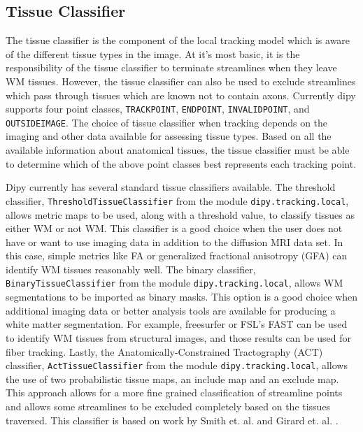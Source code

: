 \subsection{Tissue Classifier}
    The tissue classifier is the component of the local tracking model which is aware of the different tissue types in the image. At it's most basic, it is the responsibility of the tissue classifier to terminate streamlines when they leave WM tissues. However, the tissue classifier can also be used to exclude streamlines which pass through tissues which are known not to contain axons. Currently dipy supports four point classes, \verb|TRACKPOINT|, \verb|ENDPOINT|, \verb|INVALIDPOINT|, and \verb|OUTSIDEIMAGE|. The choice of tissue classifier when tracking depends on the imaging and other data available for assessing tissue types. Based on all the available information about anatomical tissues, the tissue classifier must be able to determine which of the above point classes best represents each tracking point.
    
    Dipy currently has several standard tissue classifiers available. The threshold classifier, \verb|ThresholdTissueClassifier| from the module \verb|dipy.tracking.local|, allows metric maps to be used, along with a threshold value, to classify tissues as either WM or not WM. This classifier is a good choice when the user does not have or want to use imaging data in addition to the diffusion MRI data set. In this case, simple metrics like FA or generalized fractional anisotropy (GFA) can identify WM tissues reasonably well. The binary classifier, \verb|BinaryTissueClassifier| from the module \verb|dipy.tracking.local|, allows WM segmentations to be imported as binary masks. This option is a good choice when additional imaging data or better analysis tools are available for producing a white matter segmentation. For example, freesurfer \cite{Dale_1999} or FSL's FAST \cite{Zhang_2001} can be used to identify WM tissues from structural images, and those results can be used for fiber tracking. Lastly, the Anatomically-Constrained Tractography (ACT) classifier, \verb|ActTissueClassifier| from the module \verb|dipy.tracking.local|, allows the use of two probabilistic tissue maps, an include map and an exclude map. This approach allows for a more fine grained classification of streamline points and allows some streamlines to be excluded completely based on the tissues traversed. This classifier is based on work by Smith et. al. \cite{Smith_2012} and Girard et. al. \cite{girard2014towards}.
    
